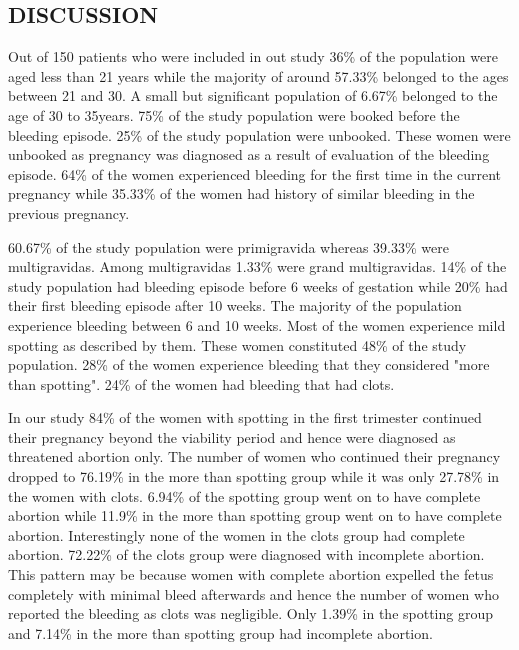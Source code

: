 \documentclass[14pt]{extarticle}
\begin{document}
\null
\vfill
\begin{flushright}
    \section{DISCUSSION}
\end{flushright}
\hrulefill
\newpage

Out of 150 patients who were included in out study 36\% of the population were aged less than 21 years while the majority of around 57.33\% belonged to the ages between 21 and 30. A small but significant population of 6.67\% belonged to the age of 30 to 35years. 75\% of the study population were booked before the bleeding episode. 25\% of the study population were unbooked. These women were unbooked as pregnancy was diagnosed as a result of evaluation of the bleeding episode. 64\% of the women experienced bleeding for the first time in the current pregnancy while 35.33\% of the women had history of similar bleeding in the previous pregnancy. 

60.67\% of the study population were primigravida whereas 39.33\% were multigravidas. Among multigravidas 1.33\% were grand multigravidas. 14\% of the study population had bleeding episode before 6 weeks of gestation while 20\% had their first bleeding episode after 10 weeks. The majority of the population experience bleeding between 6 and 10 weeks. Most of the women experience mild spotting as described by them. These women constituted 48\% of the study population. 28\% of the women experience bleeding that they considered "more than spotting". 24\% of the women had bleeding that had clots.

In our study 84\% of the women with spotting in the first trimester continued their pregnancy beyond the viability period and hence were diagnosed as threatened abortion only. The number of women who continued their pregnancy dropped to 76.19\% in the more than spotting group while it was only 27.78\% in the women with clots. 6.94\% of the spotting group went on to have complete abortion while 11.9\% in the more than spotting group went on to have complete abortion. Interestingly none of the women in the clots group had complete abortion. 72.22\% of the clots group were diagnosed with incomplete abortion. This pattern may be because women with complete abortion expelled the fetus completely with minimal bleed afterwards and hence the number of women who reported the bleeding as clots was negligible. Only 1.39\% in the spotting group and 7.14\% in the more than spotting group had incomplete abortion.
\end{document}
